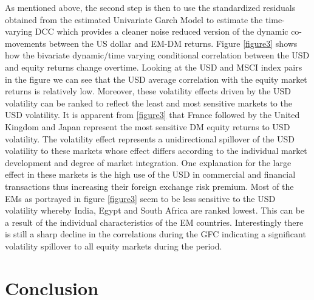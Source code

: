 \documentclass[11pt,preprint, authoryear]{elsarticle}
\numberwithin{equation}{section}
\numberwithin{figure}{section}
\numberwithin{table}{section}
\begin{document}
As mentioned above, the second step is then to use the standardized
residuals obtained from the estimated Univariate Garch Model to estimate
the time-varying DCC which provides a cleaner noise reduced version of
the dynamic co-movements between the US dollar and EM-DM returns. Figure
\ref{figure3} shows how the bivariate dynamic/time varying conditional
correlation between the USD and equity returns change overtime. Looking
at the USD and MSCI index pairs in the figure we can see that the USD
average correlation with the equity market returns is relatively low.
Moreover, these volatility effects driven by the USD volatility can be
ranked to reflect the least and most sensitive markets to the USD
volatility. It is apparent from \ref{figure3} that France followed by
the United Kingdom and Japan represent the most sensitive DM equity
returns to USD volatility. The volatility effect represents a
unidirectional spillover of the USD volatility to these markets whose
effect differs according to the individual market development and degree
of market integration. One explanation for the large effect in these
markets is the high use of the USD in commercial and financial
transactions thus increasing their foreign exchange risk premium. Most
of the EMs as portrayed in figure \ref{figure3} seem to be less
sensitive to the USD volatility whereby India, Egypt and South Africa
are ranked lowest. This can be a result of the individual
characteristics of the EM countries. Interestingly there is still a
sharp decline in the correlations during the GFC indicating a
significant volatility spillover to all equity markets during the
period.

\hypertarget{conclusion}{%
\section{Conclusion}\label{conclusion}}
\end{document}
